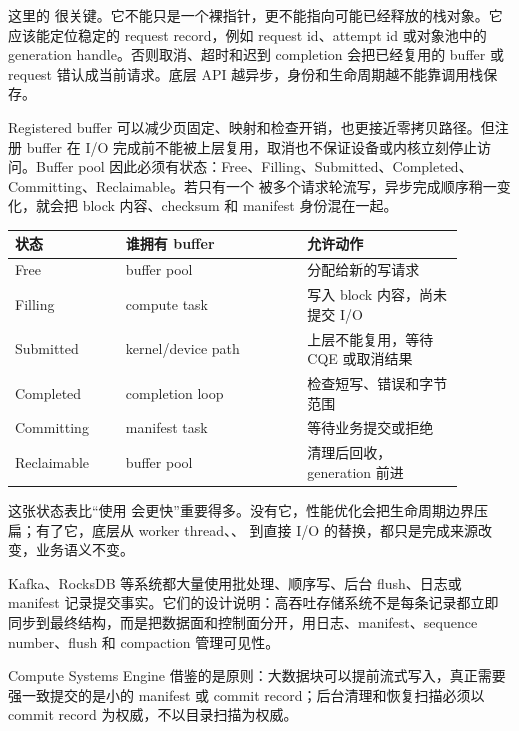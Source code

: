 这里的  很关键。它不能只是一个裸指针，更不能指向可能已经释放的栈对象。它应该能定位稳定的 request record，例如 request id、attempt id 或对象池中的 generation handle。否则取消、超时和迟到 completion 会把已经复用的 buffer 或 request 错认成当前请求。底层 API 越异步，身份和生命周期越不能靠调用栈保存。

Registered buffer 可以减少页固定、映射和检查开销，也更接近零拷贝路径。但注册 buffer 在 I/O 完成前不能被上层复用，取消也不保证设备或内核立刻停止访问。Buffer pool 因此必须有状态：Free、Filling、Submitted、Completed、Committing、Reclaimable。若只有一个  被多个请求轮流写，异步完成顺序稍一变化，就会把 block 内容、checksum 和 manifest 身份混在一起。

\begin{center}
\small
\begin{tabular}{@{}p{0.22\linewidth}p{0.36\linewidth}p{0.31\linewidth}@{}}
\toprule
状态 & 谁拥有 buffer & 允许动作 \\
\midrule
Free & buffer pool & 分配给新的写请求 \\
Filling & compute task & 写入 block 内容，尚未提交 I/O \\
Submitted & kernel/device path & 上层不能复用，等待 CQE 或取消结果 \\
Completed & completion loop & 检查短写、错误和字节范围 \\
Committing & manifest task & 等待业务提交或拒绝 \\
Reclaimable & buffer pool & 清理后回收，generation 前进 \\
\bottomrule
\end{tabular}
\end{center}

这张状态表比“使用  会更快”重要得多。没有它，性能优化会把生命周期边界压扁；有了它，底层从 worker thread、、 到直接 I/O 的替换，都只是完成来源改变，业务语义不变。

\begin{casebox}
Kafka、RocksDB 等系统都大量使用批处理、顺序写、后台 flush、日志或 manifest 记录提交事实。它们的设计说明：高吞吐存储系统不是每条记录都立即同步到最终结构，而是把数据面和控制面分开，用日志、manifest、sequence number、flush 和 compaction 管理可见性。

Compute Systems Engine 借鉴的是原则：大数据块可以提前流式写入，真正需要强一致提交的是小的 manifest 或 commit record；后台清理和恢复扫描必须以 commit record 为权威，不以目录扫描为权威。
\end{casebox}

